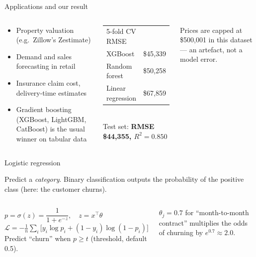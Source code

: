 \documentclass[aspectratio=169,11pt]{beamer}
\begin{document}
\begin{frame}{Applications and our result}
\begin{columns}[T]
\begin{bapp}
\begin{itemize}
\item Property valuation (e.g.\ Zillow's Zestimate)
\item Demand and sales forecasting in retail
\item Insurance claim cost, delivery-time estimates
\item Gradient boosting (XGBoost, LightGBM, CatBoost) is the usual winner on tabular data
\end{itemize}
\end{bapp}
\begin{bres}
\begin{tabular}{lr}
5-fold CV RMSE & \\
XGBoost & \$45,339\\
Random forest & \$50,258\\
Linear regression & \$67,859\\
\end{tabular}\\[2pt]
Test set: \textbf{RMSE \$44,355, $R^2=0.850$}
\end{bres}
\begin{bwarn}
Prices are capped at \$500,001 in this dataset --- an artefact, not a model error.
\end{bwarn}
\end{columns}
\end{frame}


\begin{frame}{Logistic regression}
\begin{bdef}[Classification]
Predict a \emph{category}. Binary classification outputs the probability of the positive class (here: the customer churns).
\end{bdef}
\begin{columns}[T]
\begin{bmath}
$p=\sigma(z)=\dfrac{1}{1+e^{-z}},\quad z=x^\top\theta$\\[4pt]
$\mathcal{L}=-\frac1n\sum_i\big[y_i\log p_i+(1-y_i)\log(1-p_i)\big]$\\[3pt]
Predict ``churn'' when $p\ge t$ (threshold, default 0.5).
\end{bmath}
\begin{bex}
$\theta_j=0.7$ for ``month-to-month contract'' multiplies the odds of churning by $e^{0.7}\approx2.0$.
\end{bex}
\end{columns}
\end{frame}
\end{document}
